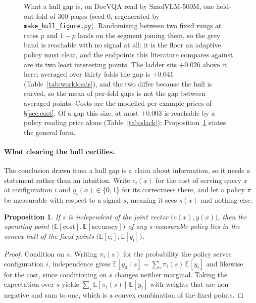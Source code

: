 \documentclass[10pt,twocolumn]{article}
\theoremstyle{plain}
\newtheorem{proposition}{Proposition}
\begin{document}
\begin{figure}[t]
\caption{What a hull gap is, on DocVQA read by SmolVLM-500M, one held-out fold
of $300$ pages (seed $0$, regenerated by \texttt{make\_hull\_figure.py}).
Randomising between two fixed rungs at rates $p$ and $1-p$ lands on the segment
joining them, so the grey band is reachable with no signal at all: it is the
floor an adaptive policy must clear, and the endpoints this literature compares
against are its two least interesting points. The ladder sits $+0.026$ above it
here; averaged over thirty folds the gap is $+0.041$
(Table~\ref{tab:workloads}), and the two differ because the hull is curved, so
the mean of per-fold gaps is not the gap between averaged points. Costs are the
modelled per-example prices of \S\ref{sec:cost}. Of a gap this size, at most
$+0.003$ is reachable by a policy reading price alone (Table~\ref{tab:slack});
Proposition~\ref{prop:hull} states the general form.}
\label{fig:hull}
\end{figure}

\paragraph{What clearing the hull certifies.} The conclusion drawn from a
hull gap is a claim about information, so it needs a statement rather than an
intuition. Write $c_i(x)$ for the
cost of serving query $x$ at configuration $i$ and $y_i(x) \in \{0,1\}$ for its
correctness there, and let a policy $\pi$ be measurable with respect to a
signal $s$, meaning it sees $s(x)$ and nothing else.

\begin{proposition}
\label{prop:hull}
If $s$ is independent of the joint
vector $\bigl(c(x), y(x)\bigr)$, then the operating point
$\bigl(\mathbb{E}[\text{cost}], \mathbb{E}[\text{accuracy}]\bigr)$ of any
$s$-measurable policy lies in the convex hull of the fixed points
$\bigl(\mathbb{E}[c_i], \mathbb{E}[y_i]\bigr)$.
\end{proposition}

\begin{proof}
Condition on $s$. Writing $\pi_i(s)$ for the probability
the policy serves configuration $i$, independence gives
$\mathbb{E}[y_{\pi} \mid s] = \sum_i \pi_i(s)\,\mathbb{E}[y_i]$ and likewise
for the cost, since conditioning on $s$ changes neither marginal. Taking the
expectation over $s$ yields $\sum_i \mathbb{E}[\pi_i(s)]\,\mathbb{E}[y_i]$ with
weights that are non-negative and sum to one, which is a convex combination of
the fixed points.
\end{proof}
\end{document}
